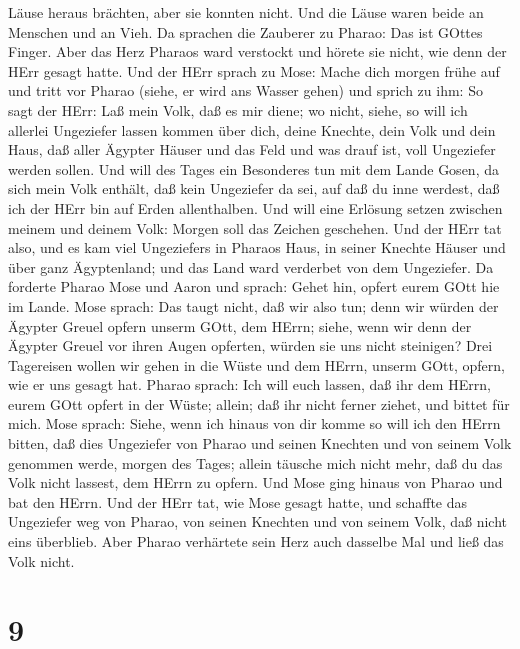 Läuse heraus brächten, aber sie konnten nicht. Und die Läuse waren beide
an Menschen und an Vieh.  Da sprachen die Zauberer zu
Pharao: Das ist GOttes Finger. Aber das Herz Pharaos ward verstockt und
hörete sie nicht, wie denn der HErr gesagt hatte.  Und der
HErr sprach zu Mose: Mache dich morgen frühe auf und tritt vor Pharao
(siehe, er wird ans Wasser gehen) und sprich zu ihm: So sagt der HErr:
Laß mein Volk, daß es mir diene;  wo nicht, siehe, so will
ich allerlei Ungeziefer lassen kommen über dich, deine Knechte, dein
Volk und dein Haus, daß aller Ägypter Häuser und das Feld und was drauf
ist, voll Ungeziefer werden sollen.  Und will des Tages ein
Besonderes tun mit dem Lande Gosen, da sich mein Volk enthält, daß kein
Ungeziefer da sei, auf daß du inne werdest, daß ich der HErr bin auf
Erden allenthalben.  Und will eine Erlösung setzen zwischen
meinem und deinem Volk: Morgen soll das Zeichen geschehen. 
Und der HErr tat also, und es kam viel Ungeziefers in Pharaos Haus, in
seiner Knechte Häuser und über ganz Ägyptenland; und das Land ward
verderbet von dem Ungeziefer.  Da forderte Pharao Mose und
Aaron und sprach: Gehet hin, opfert eurem GOtt hie im Lande.
 Mose sprach: Das taugt nicht, daß wir also tun; denn wir
würden der Ägypter Greuel opfern unserm GOtt, dem HErrn; siehe, wenn wir
denn der Ägypter Greuel vor ihren Augen opferten, würden sie uns nicht
steinigen?  Drei Tagereisen wollen wir gehen in die Wüste
und dem HErrn, unserm GOtt, opfern, wie er uns gesagt hat. 
Pharao sprach: Ich will euch lassen, daß ihr dem HErrn, eurem GOtt
opfert in der Wüste; allein; daß ihr nicht ferner ziehet, und bittet für
mich.  Mose sprach: Siehe, wenn ich hinaus von dir komme so
will ich den HErrn bitten, daß dies Ungeziefer von Pharao und seinen
Knechten und von seinem Volk genommen werde, morgen des Tages; allein
täusche mich nicht mehr, daß du das Volk nicht lassest, dem HErrn zu
opfern.  Und Mose ging hinaus von Pharao und bat den HErrn.
 Und der HErr tat, wie Mose gesagt hatte, und schaffte das
Ungeziefer weg von Pharao, von seinen Knechten und von seinem Volk, daß
nicht eins überblieb.  Aber Pharao verhärtete sein Herz
auch dasselbe Mal und ließ das Volk nicht.

\hypertarget{section-8}{%
\section{9}\label{section-8}}

